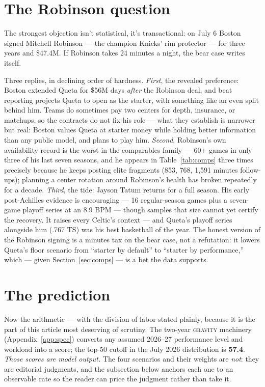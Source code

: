 \documentclass[11pt]{article}
\newcommand{\gravity}{\textsc{gravity}}
\begin{document}
\section{The Robinson question}
\label{sec:robinson}

The strongest objection isn't statistical, it's transactional: on July 6 Boston signed
Mitchell Robinson --- the champion Knicks' rim protector --- for three years and \$47.4M.
If Robinson takes 24 minutes a night, the bear case writes itself.

Three replies, in declining order of hardness. \emph{First}, the revealed preference:
Boston extended Queta for \$56M days \emph{after} the Robinson deal, and beat reporting
projects Queta to open as the starter, with something like an even split behind him.
Teams do sometimes pay two centers for depth, insurance, or matchups, so the contracts
do not fix his role --- what they establish is narrower but real: Boston values Queta
at starter money while holding better information than any public model, and plans to
play him. \emph{Second}, Robinson's own availability record is the worst in the
comparables family --- 60+ games in only three of his last seven seasons, and he appears
in Table~\ref{tab:comps} three times precisely because he keeps posting elite fragments
(853, 768, 1{,}591 minutes follow-ups); planning a center rotation around Robinson's
health has broken repeatedly for a decade. \emph{Third}, the tide: Jayson Tatum returns
for a full season. His early post-Achilles evidence is encouraging --- 16 regular-season
games plus a seven-game playoff series at an 8.9 BPM --- though samples that size cannot
yet certify the recovery. It raises every Celtic's context --- and Queta's playoff
series alongside him (.767 TS) was his best basketball of the year. The honest version of the Robinson signing is a minutes
tax on the bear case, not a refutation: it lowers Queta's floor scenario from ``starter
by default'' to ``starter by performance,'' which --- given Section~\ref{sec:comps} ---
is a bet the data supports.

\section{The prediction}
\label{sec:predict}

Now the arithmetic --- with the division of labor stated plainly, because it is the
part of this article most deserving of scrutiny. The two-year \gravity{} machinery
(Appendix~\ref{app:spec}) converts any assumed 2026--27 performance level and workload
into a score; the top-50 cutoff in the July 2026 distribution is \textbf{57.4}.
\emph{Those scores are model output.} The four scenarios and their weights are
\emph{not}: they are editorial judgments, and the subsection below anchors each one to
an observable rate so the reader can price the judgment rather than take it.
\end{document}
